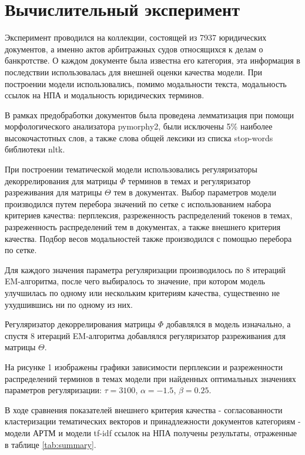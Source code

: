 \documentclass[12pt]{article}
\begin{document}
\section{Вычислительный эксперимент}
Эксперимент проводился на коллекции, состоящей из 7937 юридических документов, а именно актов арбитражных судов относящихся к делам о банкротстве. О каждом документе была известна его категория, 
эта информация в последствии использовалась для внешней оценки качества модели. При построении модели использовались, помимо модальности текста, модальность ссылок на НПА и модальность юридических терминов. 

В рамках предобработки документов была проведена лемматизация при помощи морфологического анализатора pymorphy2, были исключены 5\% наиболее высокочастотных слов, а также слова общей лексики из списка stop-words библиотеки nltk.

При построении тематической модели использовались регуляризаторы декоррелирования для матрицы $\Phi$ терминов в темах и регуляризатор разреживания для матрицы $\Theta$ тем в документах. Выбор параметров модели производился путем перебора значений по сетке с использованием набора критериев качества: перплексия, разреженность распределений токенов в темах, разреженность распределений тем в документах, а также внешнего критерия качества. Подбор весов модальностей также производился с помощью перебора по сетке.

Для каждого значения параметра регуляризации производилось по 8 итераций EM-алгоритма, после чего выбиралось то значение, при котором модель улучшилась по одному или нескольким критериям качества, существенно не ухудшившись ни по одному из них. 

Регуляризатор декоррелирования матрицы $\Phi$ добавлялся в модель изначально, а спустя 8 итераций EM-алгоритма добавлялся регуляризатор разреживания для матрицы $\Theta$. 

На рисунке 1 изображены графики зависимости перплексии и разреженности распределений терминов в темах модели при найденных оптимальных значениях параметров регуляризации: $\tau = 3100$, $\alpha = -1.5$, $\beta = 0.25$.

В ходе сравнения показателей внешнего критерия качества - согласованности кластеризации тематических векторов и принадлежности документов категориям - модели АРТМ и модели tf-idf ссылок на НПА получены результаты, отраженные в таблице \ref{tab:summary}.
\end{document}

